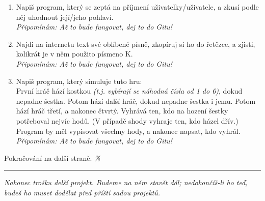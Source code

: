 \documentclass[a4paper,10pt]{article}
\newcommand\startsection[1]{
     \vspace{0.2ex}
    \hrule
    {\fontspec{Oxygen} \tiny
     \vspace{-1ex}
     \emph{#1}
     \vspace{-1.5em}
    }
}
\begin{document}
\begin{enumerate}[resume]

\item Napiš program, který se zeptá na příjmení uživatelky/uživatele,
    a zkusí podle něj uhodnout její/jeho pohlaví.
    \\\emph{\small Připomínám: Až to bude fungovat, dej to do Gitu!}

\item Najdi na internetu text své oblíbené písně, zkopíruj si ho do řetězce,
    a zjisti, kolikrát je v něm použito písmeno K.
    \\\emph{\small Připomínám: Až to bude fungovat, dej to do Gitu!}

\item Napiš program, který simuluje tuto hru:
    \\První hráč hází kostkou
    \emph{(t.j. vybírají se náhodná čísla od 1 do 6)},
    dokud nepadne šestka.
    Potom hází další hráč, dokud nepadne šestka i jemu.
    Potom hází hráč třetí, a nakonec čtvrtý.
    Vyhrává ten, kdo na hození šestky potřeboval nejvíc hodů.
    (V případě shody vyhraje ten, kdo házel dřív.)
    \\Program by měl vypisovat všechny hody, a nakonec napsat, kdo vyhrál.
    \\\emph{\small Připomínám: Až to bude fungovat, dej to do Gitu!}

\end{enumerate}

\vfill

Pokračování na další straně. \hfill \emph{\%}

\newpage

\startsection{Nakonec trošku delší projekt. Budeme na něm stavět dál; nedokončíš-li ho teď, budeš ho muset dodělat před příští sadou projektů.}

\begin{center}
\end{center}
\end{document}
